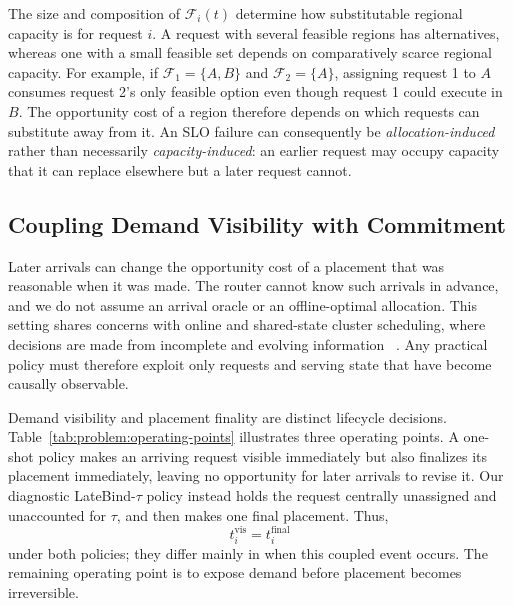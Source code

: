 \documentclass[letterpaper,twocolumn,10pt]{article}
\begin{document}
The size and composition of $\mathcal{F}_i(t)$ determine how substitutable
regional capacity is for request $i$.
A request with several feasible regions has alternatives, whereas one with a
small feasible set depends on comparatively scarce regional capacity.
For example, if
$\mathcal{F}_1=\{A,B\}$ and $\mathcal{F}_2=\{A\}$,
assigning request 1 to $A$ consumes request 2's only feasible option even though
request 1 could execute in $B$.
The opportunity cost of a region therefore depends on which requests can
substitute away from it.
An SLO failure can consequently be \emph{allocation-induced} rather than
necessarily \emph{capacity-induced}: an earlier request may occupy capacity
that it can replace elsewhere but a later request cannot.


\subsection{Coupling Demand Visibility with Commitment}
\label{sec:problem:tradeoff}

Later arrivals can change the opportunity cost of a placement that was
reasonable when it was made.
The router cannot know such arrivals in advance, and we do not assume an arrival
oracle or an offline-optimal allocation.
This setting shares concerns with online and shared-state cluster scheduling,
where decisions are made from incomplete and evolving information
~\cite{sparrow,flow_imprecise,omega,firmament}.
Any practical policy must therefore exploit only requests and serving state
that have become causally observable.

Demand visibility and placement finality are distinct lifecycle decisions.
Table~\ref{tab:problem:operating-points} illustrates three operating points.
A one-shot policy makes an arriving request visible immediately but also
finalizes its placement immediately, leaving no opportunity for later arrivals
to revise it.
Our diagnostic LateBind-$\tau$ policy instead holds the request centrally
unassigned and unaccounted for $\tau$, and then makes one final placement.
Thus,
\begin{equation}
    t_i^{\mathrm{vis}}
    =
    t_i^{\mathrm{final}}
\end{equation}
under both policies; they differ mainly in when this coupled event occurs.
The remaining operating point is to expose demand before placement becomes
irreversible.
\end{document}
